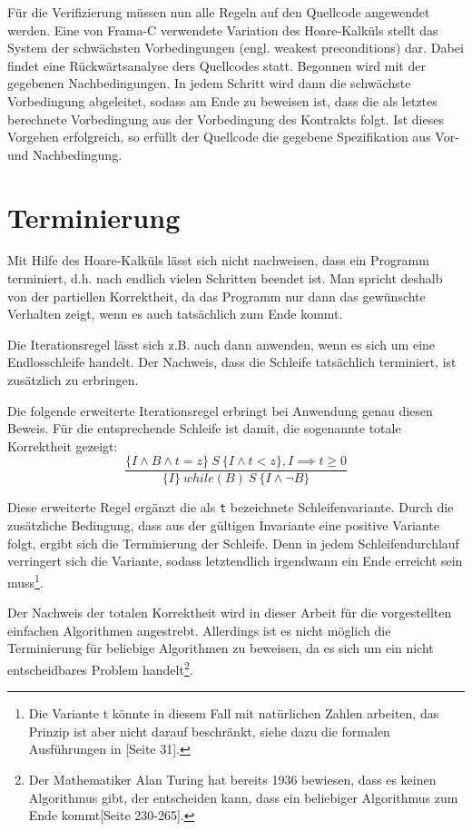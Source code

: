 Für die Verifizierung müssen nun alle Regeln auf den Quellcode angewendet werden. Eine von Frama-C verwendete Variation des Hoare-Kalküls
stellt das System der schwächsten Vorbedingungen (engl. weakest preconditions) dar. Dabei findet eine Rückwärtsanalyse
ders Quellcodes statt. Begonnen wird mit der gegebenen Nachbedingungen. In jedem Schritt wird dann die schwächste Vorbedingung
abgeleitet, sodass am Ende zu beweisen ist, dass die als letztes berechnete Vorbedingung aus der Vorbedingung des Kontrakts folgt.
Ist dieses Vorgehen erfolgreich, so erfüllt der Quellcode die gegebene Spezifikation aus Vor- und Nachbedingung.

\section{Terminierung}

Mit Hilfe des Hoare-Kalküls lässt sich nicht nachweisen, dass ein Programm terminiert, d.h. nach endlich vielen Schritten 
beendet ist. Man spricht deshalb von der partiellen Korrektheit, da das Programm nur dann das gewünschte 
Verhalten zeigt, wenn es auch tatsächlich zum Ende kommt.

Die Iterationsregel lässt sich z.B. auch dann anwenden, wenn es sich um eine Endlosschleife handelt. Der Nachweis,
dass die Schleife tatsächlich terminiert, ist zusätzlich zu erbringen. 

Die folgende erweiterte Iterationsregel erbringt bei Anwendung genau diesen Beweis. Für die entsprechende Schleife ist damit, die
sogenannte totale Korrektheit gezeigt:
\begin{displaymath}
\frac{\{I \land B \land t = z \} \:S\: \{I \land t < z\}, I \implies t \geq 0}{\{I\}\: while(B)\: S\: \{I \land \neg B\}}
\end{displaymath}

Diese erweiterte Regel ergänzt die als \lstinline{t} bezeichnete Schleifenvariante. Durch die zusätzliche Bedingung, dass aus der gültigen Invariante
eine positive Variante folgt, ergibt sich die Terminierung der Schleife. Denn in jedem Schleifendurchlauf verringert sich die Variante,
sodass letztendlich irgendwann ein Ende erreicht sein muss\footnote{Die Variante t könnte in diesem Fall mit natürlichen Zahlen arbeiten,
das Prinzip ist aber nicht darauf beschränkt, siehe dazu die formalen Ausführungen in \cite{floyd}[Seite 31].}.

Der Nachweis der totalen Korrektheit wird in dieser Arbeit für die vorgestellten einfachen Algorithmen angestrebt.
Allerdings ist es nicht möglich die Terminierung für beliebige Algorithmen zu beweisen, da es sich um ein nicht entscheidbares 
Problem handelt\footnote{Der Mathematiker Alan Turing hat bereits 1936 bewiesen, dass es keinen Algorithmus gibt, der 
entscheiden kann, dass ein beliebiger Algorithmus zum Ende kommt\cite{turing}[Seite 230-265].}.

